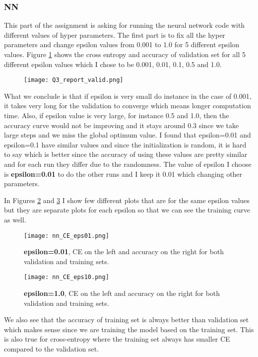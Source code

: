 \documentclass[10pt]{article}
\begin{document}
\subsubsection*{NN}
This part of the assignment is asking for running the neural network code with different values of hyper parameters. The first part is to fix all the hyper parameters and change epsilon values from 0.001 to 1.0 for 5 different epsilon values.
Figure \ref{fig:Q3_valid_combined} shows the cross entropy and accuracy of validation set for all 5 different epsilon values which I chose to be 0.001, 0.01, 0.1, 0.5 and 1.0.
\begin{figure}[H]
	\centering
	\texttt{[image: Q3\_report\_valid.png]}
	\caption{}
	\label{fig:Q3_valid_combined}
\end{figure}
What we conclude is that if epsilon is very small do instance in the case of 0.001, it takes very long for the validation to converge which means longer computation time. Also, if epsilon value is very large, for instance 0.5 and 1.0, then the accuracy curve would not be improving and it stays around 0.3 since we take large steps and we miss the global optimum value. I found that epsilon=0.01 and epsilon=0.1 have similar values and since the initialization is random, it is hard to say which is better since the accuracy of using these values are pretty similar and for each run they differ due to the randomness. The value of epsilon I choose is \textbf{epsilon=0.01} to do the other runs and I keep it 0.01 which changing other parameters.

In Figures \ref{fig:refer1} and \ref{fig:refer2} I show few different plots that are for the same epsilon values but they are separate plots for each epsilon so that we can see the training curve as well.
\begin{figure}[H]
	\centering
	\texttt{[image: nn\_CE\_eps01.png]}
	\caption{\textbf{epsilon=0.01}, CE on the left and accuracy on the right for both validation and training sets.}
	\label{fig:refer1}
\end{figure}

\begin{figure}[H]
	\centering
	\texttt{[image: nn\_CE\_eps10.png]}
	\caption{\textbf{epsilon=1.0}, CE on the left and accuracy on the right for both validation and training sets.}
	\label{fig:refer2}
\end{figure}

We also see that the accuracy of training set is always better than validation set which makes sense since we are training the model based on the training set.
This is also true for cross-entropy where the training set always has smaller CE compared to the validation set.
\end{document}
